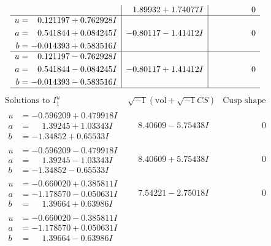 \documentclass[1p]{elsarticle_modified}
\theoremstyle{definition}
\newcommand{\I}{\sqrt{-1}}
\begin{document}
$$\begin{array}{c|c|c}
 & \phantom{-}1.89932 + 1.74077 I & \phantom{-0.000000 } 0 \\ \hline\begin{aligned}
u &= \phantom{-}0.121197 + 0.762928 I \\
a &= \phantom{-}0.541844 + 0.084245 I \\
b &= -0.014393 + 0.583516 I\end{aligned}
 & -0.80117 - 1.41412 I & \phantom{-0.000000 } 0 \\ \hline\begin{aligned}
u &= \phantom{-}0.121197 - 0.762928 I \\
a &= \phantom{-}0.541844 - 0.084245 I \\
b &= -0.014393 - 0.583516 I\end{aligned}
 & -0.80117 + 1.41412 I & \phantom{-0.000000 } 0\\
 \hline 
 \end{array}$$\newpage$$\begin{array}{c|c|c}  
\text{Solutions to }I^u_{1}& \I (\text{vol} + \sqrt{-1}CS) & \text{Cusp shape}\\
 \hline 
\begin{aligned}
u &= -0.596209 + 0.479918 I \\
a &= \phantom{-}1.39245 + 1.03343 I \\
b &= -1.34852 + 0.65533 I\end{aligned}
 & \phantom{-}8.40609 - 5.75438 I & \phantom{-0.000000 } 0 \\ \hline\begin{aligned}
u &= -0.596209 - 0.479918 I \\
a &= \phantom{-}1.39245 - 1.03343 I \\
b &= -1.34852 - 0.65533 I\end{aligned}
 & \phantom{-}8.40609 + 5.75438 I & \phantom{-0.000000 } 0 \\ \hline\begin{aligned}
u &= -0.660020 + 0.385811 I \\
a &= -1.178570 - 0.050631 I \\
b &= \phantom{-}1.39664 + 0.63986 I\end{aligned}
 & \phantom{-}7.54221 - 2.75018 I & \phantom{-0.000000 } 0 \\ \hline\begin{aligned}
u &= -0.660020 - 0.385811 I \\
a &= -1.178570 + 0.050631 I \\
b &= \phantom{-}1.39664 - 0.63986 I\end{aligned}

\end{array}$$
\end{document}
